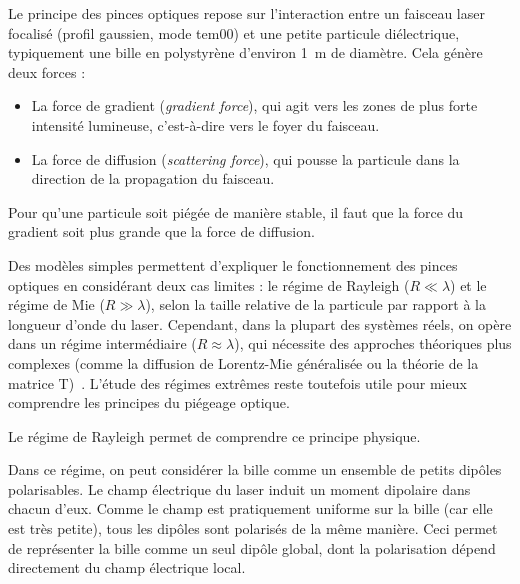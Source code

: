 Le principe des pinces optiques repose sur l'interaction entre un faisceau laser focalisé (profil gaussien, mode \gls{tem00}) et une petite particule diélectrique, typiquement une bille en polystyrène d'environ 1~\textmu m de diamètre. Cela génère deux forces :
\begin{itemize}[label=\textbullet]
    \item La force de gradient (\textit{gradient force}), qui agit vers les zones de plus forte intensité lumineuse, c'est-à-dire vers le foyer du faisceau.
    \item La force de diffusion (\textit{scattering force}), qui pousse la particule dans la direction de la propagation du faisceau.
\end{itemize}
Pour qu'une particule soit piégée de manière stable, il faut que la force du gradient soit plus grande que la force de diffusion.

Des modèles simples permettent d'expliquer le fonctionnement des pinces optiques en considérant deux cas limites : le régime de Rayleigh ($R \ll \lambda$) et le régime de Mie ($R \gg \lambda$), selon la taille relative de la particule par rapport à la longueur d'onde du laser.
Cependant, dans la plupart des systèmes réels, on opère dans un régime intermédiaire ($R \approx \lambda$), qui nécessite des approches théoriques plus complexes (comme la diffusion de Lorentz-Mie généralisée ou la théorie de la matrice T)~\cite{epflExplanationOpticalTweezers}.
L'étude des régimes extrêmes reste toutefois utile pour mieux comprendre les principes du piégeage optique.

Le régime de Rayleigh permet de comprendre ce principe physique.

Dans ce régime, on peut considérer la bille comme un ensemble de petits dipôles polarisables. Le champ électrique du laser induit un moment dipolaire dans chacun d'eux. Comme le champ est pratiquement uniforme sur la bille (car elle est très petite), tous les dipôles sont polarisés de la même manière. Ceci permet de représenter la bille comme un seul dipôle global, dont la polarisation dépend directement du champ électrique local.

